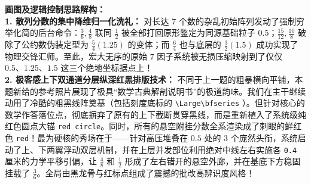 \vspace{0.4cm}
{\small\color{blue!70!black}
\textbf{画图及逻辑控制思路解构：}\\
\textbf{1. 散列分数的集中降维归一化洗礼：} 对长达 $7$ 个数的杂乱初始阵列发动了强制穷举化简的后台命令：$\frac{3}{6}, \frac{4}{8}$ 联同 $\frac{1}{2}$ 被全部打回原形鉴定为同源基础粒子 $0.5$；$\frac{15}{12}, \frac{10}{8}$ 破除了公约数伪装定型为 $\frac{5}{4} (1.25)$ 的变体；而 $\frac{6}{4}$ 也与底层的 $\frac{3}{2} (1.5)$ 成功实现了物理交锋汇师。至此，宏大无序的原始 $7$ 因子系统被无损压缩映射到了仅仅 $0.5、 1.25、 1.5$ 这三个绝地坐标据点上！\\
\textbf{2. 极客感上下双通道分层纵深红黑排版技术：} 不同于上一题的粗暴横向平铺，本题新给的参考照片展现了极具“数学古典解剖说明书”的极道韵味。我们在主干继续动用了冷酷的粗黑线阵奠基（包括刻度底标的 \texttt{\textbackslash{}Large\textbackslash{}bfseries} ）。但针对核心的数学作答落位点，彻底摒弃了原有的上下截断贯穿黑线，而是重新植入了系统级纯红色圆点大锚 \texttt{red circle}。同时，所有的悬空附挂分数全系渲染成了刺眼的鲜红色 \texttt{red}！最为硬核的秀场在于——针对高压堆叠在 $0.5$ 处的 $3$ 个庞然头衔，系统启动了上、下两翼浮动双层机制，并在上层并发部位利用绝对中线左右实施各 \texttt{0.4} 厘米的力学平移引偏，让 $\frac{4}{8}$ 和 $\frac{1}{2}$ 形成了左右错开的悬空外廊，并在基底下方稳固挂载了 $\frac{3}{6}$。全局由黑龙骨与红标点组成了震撼的批改高辨识度风格！
}

\newpage



